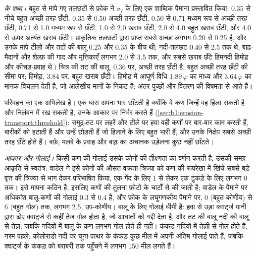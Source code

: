 \emph{ के शब्द।} बहुत से मापे गए तलछटों से फ़ोक ने $\sigma_I$ के लिए एक शाब्दिक पैमाना प्रस्तावित किया: \num{0.35} से नीचे बहुत अच्छी तरह छँटी, \num{0.35} से \num{0.50} अच्छी तरह छँटी, \num{0.50} से \num{0.71} मध्यम रूप से अच्छी तरह छँटी, \num{0.71} से \num{1.0} मध्यम रूप से छँटी, \num{1.0} से \num{2.0} खराब छँटी, \num{2.0} से \num{4.0} बहुत खराब छँटी, और \num{4.0} से ऊपर अत्यंत खराब छँटी। प्राकृतिक तलछटों द्वारा प्राप्त सबसे अच्छा  लगभग \num{0.20} से \num{0.25} है, और उनके मापे टीलों और तटों की बालू \num{0.25} और \num{0.35} के बीच थी; नदी-तलछट \num{0.40} से \num{2.5} तक थे, बाढ़-मैदानों और शेल्फ़ की गाद और मृत्तिकाएँ लगभग \num{2.0} से \num{3.5} तक, और सबसे खराब छँटे हिमनदी हिमोढ़ और कीचड़-प्रवाह थे। चित्र की तट की बालू, \num{0.36} पर, अच्छी तरह छँटी है, बहुत अच्छी तरह छँटी की सीमा पर; हिमोढ़, \num{3.84} पर, बहुत खराब छँटी। हिमोढ़ में आघूर्ण-विधि $1.89\,\varphi$ का माध्य और $3.64\,\varphi$ का मानक विचलन देती है, जो आलेखीय मानों के निकट है; अंतर पुच्छों और वितरण की विषमता से आते हैं।

 परिवहन का एक अभिलेख है। एक धारा अपना भार छाँटती है क्योंकि वे कण जिन्हें वह हिला सकती है और निलंबन में रख सकती है, उनके आकार पर निर्भर करते हैं (\cref{sec:b1:erosion-transport:threshold}): समुद्र-तट पर लहरें और टीले पर हवा वही कणों पर बार-बार काम करती हैं, बारीकों को हटाती हैं और उन्हें छोड़ती हैं जो हिलाने के लिए बहुत भारी हैं, और उनके निक्षेप सबसे अच्छी तरह छँटे होते हैं। बर्फ़, मलबे के प्रवाह और बाढ़ का अचानक उड़ेलना कुछ नहीं छाँटते।

\emph{आकार और गोलाई।} किसी कण की गोलाई उसके कोनों की तीक्ष्णता का वर्णन करती है, उसकी समग्र आकृति से स्वतंत्र: वाडेल ने इसे कोनों की औसत वक्रता-त्रिज्या को कण की रूपरेखा में खिंचे सबसे बड़े वृत्त की त्रिज्या से भाग देकर परिभाषित किया, एक गेंद के लिए 1 से लेकर एक टुकड़े के लिए लगभग 0 तक। इसे मापना कठिन है, इसलिए कणों की तुलना फ़ोटो के चार्टों से की जाती है; वाडेल के पैमाने पर अधिकांश बालू-कणों की गोलाई \num{0.3} से \num{0.4} है, और फ़ोक के लघुगणकीय पैमाने पर, 0 (बहुत कोणीय) से 6 (बहुत गोल) तक, लगभग \num{2.5}, उप-कोणीय। बालू के लिए गोलाई धीमी है: हवा से उड़ा क्वार्ट्ज पानी द्वारा ढोए क्वार्ट्ज से कहीं तेज़ गोल होता है, जो आघातों को गद्दी देता है, और तट की बालू नदी की बालू से तेज़; जबकि नदियों में बालू के कण लगभग गोल होते ही नहीं। कंकड़ नदियों में तेज़ी से गोल होते हैं, नरम पहले: कोलोराडो नदी पर चूना-पत्थर के कंकड़ कुछ मील में अपनी अंतिम गोलाई पाते हैं, जबकि क्वार्ट्ज के कंकड़ को बराबरी तक पहुँचने में लगभग \num{150} मील लगते हैं।

